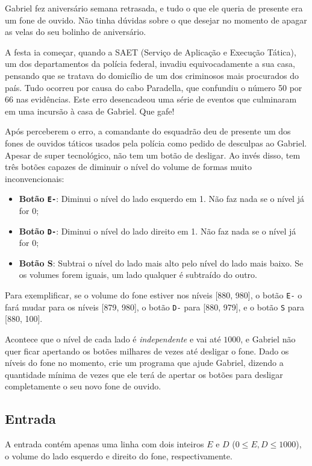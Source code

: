 Gabriel fez aniversário semana retrasada, e tudo o que ele queria de presente era um fone de ouvido. Não tinha dúvidas sobre o que desejar no momento de apagar as velas do seu bolinho de aniversário. 

A festa ia começar, quando a SAET (Serviço de Aplicação e Execução Tática), um dos departamentos da polícia federal, invadiu equivocadamente a sua casa, pensando que se tratava do domicílio de um dos criminosos mais procurados do país. Tudo ocorreu por causa do cabo Paradella, que confundiu o número 50 por 66 nas evidências. Este erro desencadeou uma série de eventos que culminaram em uma incursão à casa de Gabriel. Que gafe!

Após perceberem o erro, a comandante do esquadrão deu de presente um dos fones de ouvidos táticos usados pela polícia como pedido de desculpas ao Gabriel. Apesar de super tecnológico, não tem um botão de desligar. Ao invés disso, tem três botões capazes de diminuir o nível do volume de formas muito inconvencionais:

\begin{itemize}
\item \textbf{Botão \texttt{E-}}: Diminui o nível do lado esquerdo em 1. Não faz nada se o nível já for 0;
\item \textbf{Botão \texttt{D-}}: Diminui o nível do lado direito em 1. Não faz nada se o nível já for 0;
\item \textbf{Botão S}: Subtrai o nível do lado mais alto pelo nível do lado mais baixo. Se os volumes forem iguais, um lado qualquer é subtraído do outro.
\end{itemize}

Para exemplificar, se o volume do fone estiver nos níveis [880, 980], o botão \texttt{E-} o fará mudar para os níveis [879, 980], o botão \texttt{D-} para [880, 979], e o botão \texttt{S} para [880, 100].

Acontece que o nível de cada lado é \textit{independente} e vai até $1000$, e Gabriel não quer ficar apertando os botões milhares de vezes até desligar o fone. Dado os níveis do fone no momento, crie um programa que ajude Gabriel, dizendo a quantidade mínima de vezes que ele terá de apertar os botões para desligar completamente o seu novo fone de ouvido.

\subsection*{Entrada}
A entrada contém apenas uma linha com dois inteiros $E$ e $D$ ($0 \leq E, D \leq 1000$), o volume do lado esquerdo e direito do fone, respectivamente.

